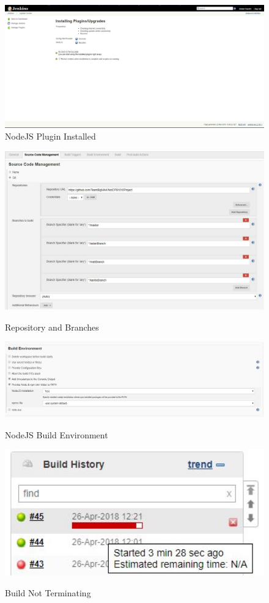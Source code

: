 \documentclass[paper=a4,fontsize=11pt]{article}
\newcommand{\sepspace}{\vspace*{1em}}		%
\begin{document}
\begin{figure}[H]
  \caption{NodeJS Plugin Installed}
  \includegraphics[width=15cm]{Jenkins/pic5.JPG}
\end{figure}
\begin{figure}[H]
  \caption{Repository and Branches}
  \includegraphics[width=15cm]{Jenkins/pic1.JPG}\\
  \sepspace
\end{figure}
\begin{figure}[H]
  \caption{NodeJS Build Environment}
  \includegraphics[width=15cm]{Jenkins/pic2.JPG}\\
  \sepspace
\end{figure}
\begin{figure}[H]
  \caption{Build Not Terminating}
  \includegraphics[width=15cm]{Jenkins/pic3.JPG}\\
  \sepspace
\end{figure}
\end{document}
